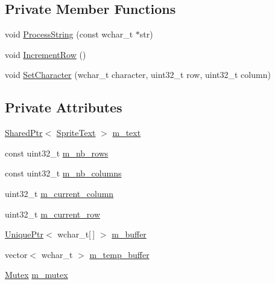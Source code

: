 \subsection*{Private Member Functions}
\begin{DoxyCompactItemize}
\item 
void \hyperlink{classmage_1_1_text_console_script_ac1e1d4768ead2de82493ab487449bbd8}{Process\+String} (const wchar\+\_\+t $\ast$str)
\item 
void \hyperlink{classmage_1_1_text_console_script_a0e82c5d5b84499bf4ed2233cf26145fa}{Increment\+Row} ()
\item 
void \hyperlink{classmage_1_1_text_console_script_a08324571bfbe793eafedc22126e575b9}{Set\+Character} (wchar\+\_\+t character, uint32\+\_\+t row, uint32\+\_\+t column)
\end{DoxyCompactItemize}
\subsection*{Private Attributes}
\begin{DoxyCompactItemize}
\item 
\hyperlink{namespacemage_a1e01ae66713838a7a67d30e44c67703e}{Shared\+Ptr}$<$ \hyperlink{classmage_1_1_sprite_text}{Sprite\+Text} $>$ \hyperlink{classmage_1_1_text_console_script_a761287353d8f9b031beb890c9f6c7203}{m\+\_\+text}
\item 
const uint32\+\_\+t \hyperlink{classmage_1_1_text_console_script_ac2e2d9630355f22945259d5a0af135ef}{m\+\_\+nb\+\_\+rows}
\item 
const uint32\+\_\+t \hyperlink{classmage_1_1_text_console_script_a6a4f3fdc2fb4be3c01e83363c5d7f631}{m\+\_\+nb\+\_\+columns}
\item 
uint32\+\_\+t \hyperlink{classmage_1_1_text_console_script_ac08f796712a2dc5d6e78a3f558272dff}{m\+\_\+current\+\_\+column}
\item 
uint32\+\_\+t \hyperlink{classmage_1_1_text_console_script_aedb5aebdee16791c69e0143525ee9d10}{m\+\_\+current\+\_\+row}
\item 
\hyperlink{namespacemage_a8c307fbcc33bce9b7f2aa4c26c3b95cf}{Unique\+Ptr}$<$ wchar\+\_\+t\mbox{[}$\,$\mbox{]} $>$ \hyperlink{classmage_1_1_text_console_script_a526410b1b43646948809b772c5446346}{m\+\_\+buffer}
\item 
vector$<$ wchar\+\_\+t $>$ \hyperlink{classmage_1_1_text_console_script_a6500bfd006f5c90d05f3da7f3e8e75a8}{m\+\_\+temp\+\_\+buffer}
\item 
\hyperlink{structmage_1_1_mutex}{Mutex} \hyperlink{classmage_1_1_text_console_script_a7212b01c007fc3d2fd11620c570f1c55}{m\+\_\+mutex}
\end{DoxyCompactItemize}
